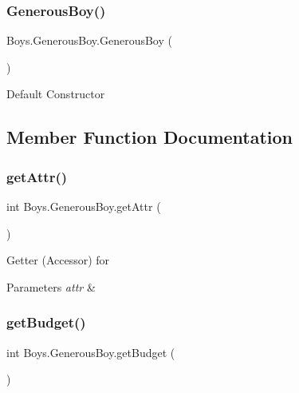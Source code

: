 \subsubsection{\texorpdfstring{Generous\+Boy()}{GenerousBoy()}\hspace{0.1cm}{\footnotesize\ttfamily [2/2]}}
{\footnotesize\ttfamily Boys.\+Generous\+Boy.\+Generous\+Boy (\begin{DoxyParamCaption}{ }\end{DoxyParamCaption})\hspace{0.3cm}{\ttfamily [inline]}}

Default Constructor 

\subsection{Member Function Documentation}
\mbox{\label{class_boys_1_1_generous_boy_a2a49cbbaddb3bbc1144c053eea37178e}} 
\subsubsection{\texorpdfstring{get\+Attr()}{getAttr()}}
{\footnotesize\ttfamily int Boys.\+Generous\+Boy.\+get\+Attr (\begin{DoxyParamCaption}{ }\end{DoxyParamCaption})\hspace{0.3cm}{\ttfamily [inline]}}

Getter (Accessor) for 
\begin{DoxyParams}{Parameters}
{\em attr} & \\
\hline
\end{DoxyParams}
\mbox{\label{class_boys_1_1_generous_boy_ad67b76eacea6c4575356f101b96ab335}} 
\subsubsection{\texorpdfstring{get\+Budget()}{getBudget()}}
{\footnotesize\ttfamily int Boys.\+Generous\+Boy.\+get\+Budget (\begin{DoxyParamCaption}{ }\end{DoxyParamCaption})\hspace{0.3cm}{\ttfamily [inline]}}

